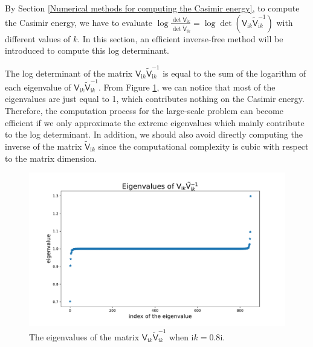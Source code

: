 By Section \ref{Numerical methods for computing the Casimir energy}, to compute the Casimir energy, we have to evaluate 
$\log\frac{\det\mathsf{V}_{\mathrm{i}k}}{\det\tilde{\mathsf{V}}_{\mathrm{i}k}} = \log\det(\mathsf{V}_{\mathrm{i}k}\tilde{\mathsf{V}}_{\mathrm{i}k}^{-1})$ 
with different values of $k$. In this section, an efficient inverse-free method will be introduced to compute this log determinant.

The log determinant of the matrix $\mathsf{V}_{\mathrm{i}k}\tilde{\mathsf{V}}_{\mathrm{i}k}^{-1}$ is equal to the sum of the logarithm of each eigenvalue of 
$\mathsf{V}_{\mathrm{i}k}\tilde{\mathsf{V}}_{\mathrm{i}k}^{-1}$. From Figure \ref{eigenvalues of VVtilde}, we can notice that most of the eigenvalues are just 
equal to 1, which contributes nothing on the Casimir energy. Therefore, the computation process for the large-scale problem can become efficient if we only approximate the extreme eigenvalues 
which mainly contribute to the log determinant. In addition, we should also avoid directly computing the inverse of the matrix $\tilde{\mathsf{V}}_{\mathrm{i}k}$
since the computational complexity is cubic with respect to the matrix dimension.
\begin{figure}[H]
    \centering
    \includegraphics[scale = 0.5]{figures/eigenvalue_of_VVtilde.pdf}
    \caption{The eigenvalues of the matrix $\mathsf{V}_{\mathrm{i}k}\tilde{\mathsf{V}}_{\mathrm{i}k}^{-1}$ when $\mathrm{i}k = 0.8\mathrm{i}$.}
    \label{eigenvalues of VVtilde}
\end{figure}

